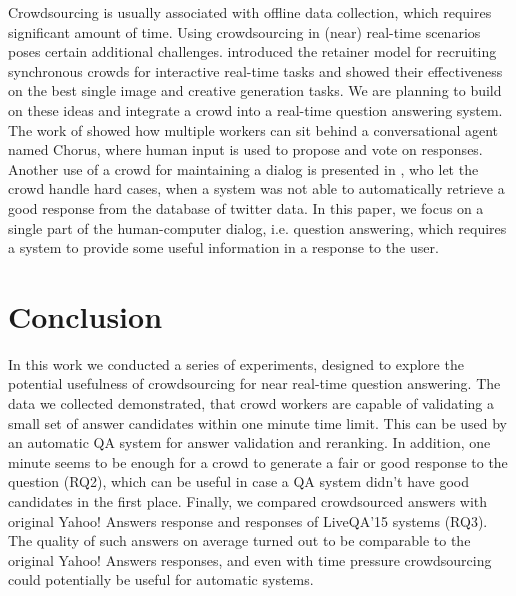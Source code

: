 \documentclass[11pt,letterpaper]{article}
\begin{document}
Crowdsourcing is usually associated with offline data collection, which requires significant amount of time.
Using crowdsourcing in (near) real-time scenarios poses certain additional challenges.
\cite{bernstein2011crowds} introduced the retainer model for recruiting synchronous crowds for interactive real-time tasks and showed their effectiveness on the best single image and creative generation tasks.
We are planning to build on these ideas and integrate a crowd into a real-time question answering system.
The work of \cite{Lasecki:2013:CCC:2501988.2502057} showed how multiple workers can sit behind a conversational agent named Chorus, where human input is used to propose and vote on responses. 
Another use of a crowd for maintaining a dialog is presented in \cite{Bessho:2012:DSU:2392800.2392841}, who let the crowd handle hard cases, when a system was not able to automatically retrieve a good response from the database of twitter data.
In this paper, we focus on a single part of the human-computer dialog, i.e. question answering, which requires a system to provide some useful information in a response to the user.


\section{Conclusion}
\label{sec:conclusion}

In this work we conducted a series of experiments, designed to explore the potential usefulness of crowdsourcing for near real-time question answering.
The data we collected demonstrated, that crowd workers are capable of validating a small set of answer candidates within one minute time limit.
This can be used by an automatic QA system for answer validation and reranking.
In addition, one minute seems to be enough for a crowd to generate a fair or good response to the question (RQ2), which can be useful in case a QA system didn't have good candidates in the first place.
Finally, we compared crowdsourced answers with original Yahoo! Answers response and responses of LiveQA'15 systems (RQ3).
The quality of such answers on average turned out to be comparable to the original Yahoo! Answers responses, and even with time pressure crowdsourcing could potentially be useful for automatic systems.




\end{document}
